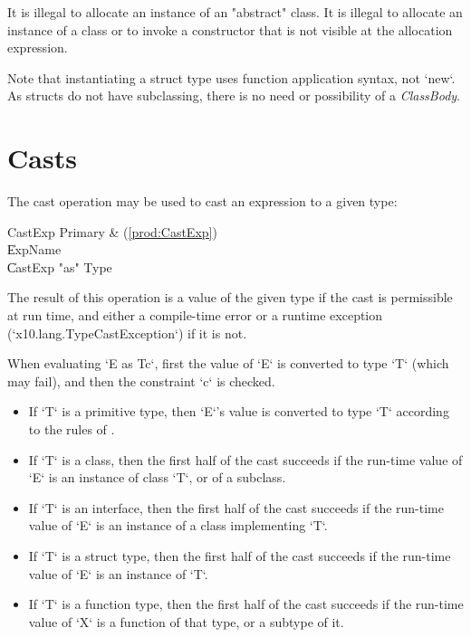 It is illegal to allocate an instance of an \xcd"abstract" class.
It is illegal to allocate an instance of a class or to invoke a
constructor that is not visible at
the allocation expression.

Note that instantiating a struct type uses function application syntax, not
\xcd`new`.  As structs do not have subclassing, there is no need or
possibility of a {\em ClassBody}.


\section{Casts}\label{ClassCast}

The cast operation may be used to cast an expression to a given type:

\begin{bbgrammar}
             CastExp \: Primary & (\ref{prod:CastExp}) \\
                    \| ExpName \\
                    \| CastExp \xcd"as" Type \\
\end{bbgrammar}

The result of this operation is a value of the given type if the cast
is permissible at run time, and either a compile-time error or a runtime
exception 
(\xcd`x10.lang.TypeCastException`) if it is not.  

When evaluating \xcd`E as T{c}`, first the value of \xcd`E` is converted to
type \xcd`T` (which may fail), and then the constraint \xcd`{c}` is checked. 



\begin{itemize}
\item If \xcd`T` is a primitive type, then \xcd`E`'s value is converted to type
      \xcd`T` according to the rules of
      . 
      
\item If \xcd`T` is a class, then the first half of the cast succeeds if the
      run-time value of \xcd`E` is an instance of class \xcd`T`, or of a
      subclass. 

\item If \xcd`T` is an interface, then the first half of the cast succeeds if
      the run-time value of \xcd`E` is an instance of a class implementing
      \xcd`T`. 

\item If \xcd`T` is a struct type, then the first half of the cast succeeds if
      the run-time value of \xcd`E` is an instance of \xcd`T`.  

\item If \xcd`T` is a function type, then the first half of the cast succeeds
      if the run-time value of \xcd`X` is a function of that type, or a
      subtype of it.
\end{itemize}

